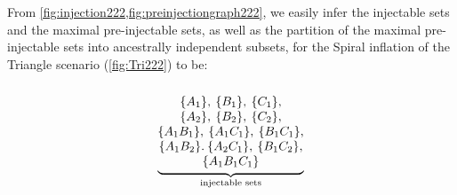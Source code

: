\documentclass[aps,english,superscriptaddress,onecolumn,twoside,longbibliography,pra,floatfix,fleqn,nofootinbib]{revtex4-1}%
\theoremstyle{definition}
\newcommand{\aindep}{\perp} %
\DeclarePairedDelimiter{\braces}{\lbrace}{\rbrace}
\newcommand{\brackets}[1]{\braces*{#1}}
\begin{document}
From \cref{fig:injection222,fig:preinjectiongraph222}, we easily infer the injectable sets and the maximal pre-injectable sets, as well as the partition of the maximal pre-injectable sets into ancestrally independent subsets, for the  Spiral inflation of the Triangle scenario (\cref{fig:Tri222}) to be:
\begin{align}\label{eq:basicsetup222}
{\underbrace{\begin{matrix}
\, \\
\brackets{A_1},\:\brackets{B_1},\:\brackets{C_1},\\
\brackets{A_2},\:\brackets{B_2},\:\brackets{C_2},\\
\brackets{A_1 B_1},\:\brackets{A_1 C_1},\:\brackets{B_1 C_1},\\
\brackets{A_1 B_2}.\:\brackets{A_2 C_1},\:\brackets{B_1 C_2},\\
\brackets{A_1 B_1 C_1}
\end{matrix}}_{\substack{\text{injectable sets}}}}

\end{align}
\end{document}
